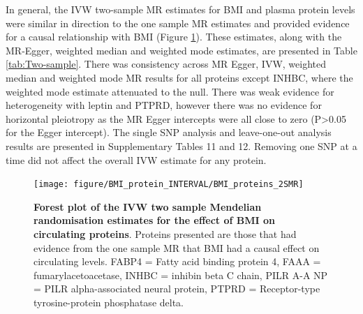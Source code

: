\documentclass[11pt,twoside]{bristolthesis}
\begin{document}
In general, the IVW two-sample MR estimates for BMI and plasma protein levels were similar in direction to the one sample MR estimates and provided evidence for a causal relationship with BMI (Figure \ref{fig:two-sample-forest}). These estimates, along with the MR-Egger, weighted median and weighted mode estimates, are presented in Table \ref{tab:Two-sample}. There was consistency across MR Egger, IVW, weighted median and weighted mode MR results for all proteins except INHBC, where the weighted mode estimate attenuated to the null. There was weak evidence for heterogeneity with leptin and PTPRD, however there was no evidence for horizontal pleiotropy as the MR Egger intercepts were all close to zero (P\textgreater0.05 for the Egger intercept). The single SNP analysis and leave-one-out analysis results are presented in Supplementary Tables 11 and 12. Removing one SNP at a time did not affect the overall IVW estimate for any protein.




\begin{figure}

{\centering \texttt{[image: figure/BMI\_protein\_INTERVAL/BMI\_proteins\_2SMR]} 

}

\caption[Forest plot of the IVW two sample MR estimates for the effect of BMI on circulating proteins]{\textbf{Forest plot of the IVW two sample Mendelian randomisation estimates for the effect of BMI on circulating proteins}. Proteins presented are those that had evidence from the one sample MR that BMI had a causal effect on circulating levels. FABP4 = Fatty acid binding protein 4, FAAA = fumarylacetoacetase, INHBC = inhibin beta C chain, PILR A-A NP = PILR alpha-associated neural protein, PTPRD = Receptor-type tyrosine-protein phosphatase delta.}\label{fig:two-sample-forest}
\end{figure}
\end{document}
